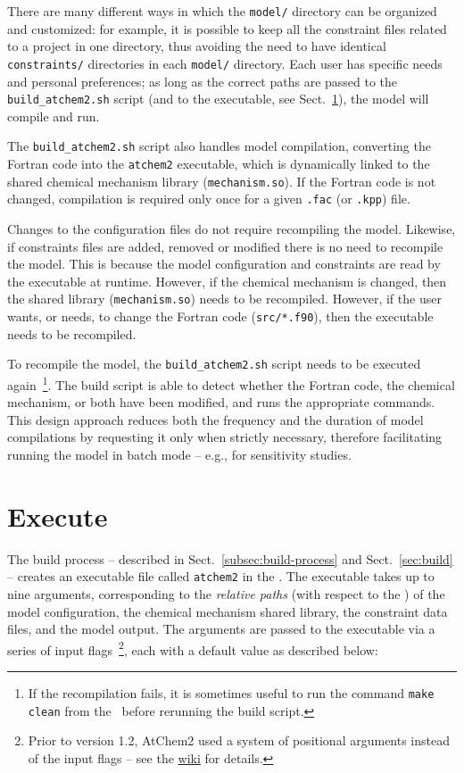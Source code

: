 There are many different ways in which the \texttt{model/} directory
can be organized and customized: for example, it is possible to keep
all the constraint files related to a project in one directory, thus
avoiding the need to have identical \texttt{constraints/} directories
in each \texttt{model/} directory. Each user has specific needs and
personal preferences; as long as the correct paths are passed to the
\texttt{build\_atchem2.sh} script (and to the executable, see
Sect.~\ref{sec:execute}), the model will compile and run.

The \texttt{build\_atchem2.sh} script also handles model compilation,
converting the Fortran code into the \texttt{atchem2} executable,
which is dynamically linked to the shared chemical mechanism library
(\texttt{mechanism.so}). If the Fortran code is not changed,
compilation is required only once for a given \texttt{.fac} (or
\texttt{.kpp}) file.

Changes to the configuration files do not require recompiling the
model. Likewise, if constraints files are added, removed or modified
there is no need to recompile the model. This is because the model
configuration and constraints are read by the executable at
runtime. However, if the chemical mechanism is changed, then the
shared library (\texttt{mechanism.so}) needs to be recompiled.
However, if the user wants, or needs, to change the Fortran code
(\texttt{src/*.f90}), then the executable needs to be recompiled.

To recompile the model, the \texttt{build\_atchem2.sh} script needs to
be executed again~\footnote{If the recompilation fails, it is
  sometimes useful to run the command \texttt{make clean} from the
  \maindir\ before rerunning the build script.}. The build script is
able to detect whether the Fortran code, the chemical mechanism, or
both have been modified, and runs the appropriate commands. This
design approach reduces both the frequency and the duration of model
compilations by requesting it only when strictly necessary, therefore
facilitating running the model in batch mode -- e.g., for sensitivity
studies.

\section{Execute} \label{sec:execute}

The build process -- described in Sect.~\ref{subsec:build-process} and
Sect.~\ref{sec:build} -- creates an executable file called
\texttt{atchem2} in the \maindir. The executable takes up to nine
arguments, corresponding to the \emph{relative paths} (with respect to
the \maindir) of the model configuration, the chemical mechanism
shared library, the constraint data files, and the model output. The
arguments are passed to the executable via a series of input
flags~\footnote{Prior to version 1.2, AtChem2 used a system of
  positional arguments instead of the input flags -- see the
  \href{https://github.com/AtChem/AtChem2/wiki/How-to-run-AtChem2}{wiki}
  for details.}, each with a default value as described below:

